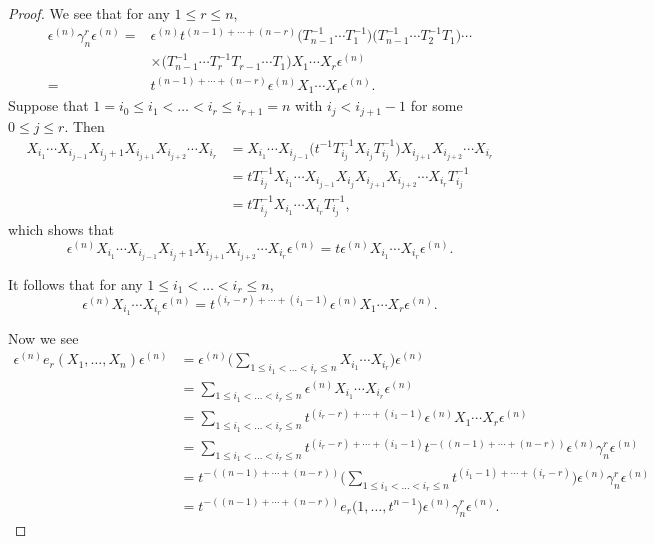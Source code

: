 \documentclass[10pt,a4paper]{amsart}
\numberwithin{equation}{section}
\theoremstyle{definition}
\begin{document}
\begin{proof}
 We see that for any $1\leq r \leq n$,
 \begin{align*}
 \epsilon^{(n)} \gamma_n^{r} \epsilon^{(n)}
 ={}& \epsilon^{(n)}t^{(n-1)+\cdots + (n-r)} \bigl(T_{n-1}^{-1}\cdots T_1^{-1}\bigr)\bigl(T_{n-1}^{-1}\cdots T_2^{-1}T_1\bigr)\cdots\\
 & \times \bigl(T_{n-1}^{-1}\cdots T_r^{-1}T_{r-1}\cdots T_1\bigr) X_1\cdots X_r \epsilon^{(n)} \\
 ={}& t^{(n-1)+\cdots + (n-r)} \epsilon^{(n)} X_1\cdots X_r \epsilon^{(n)}.
 \end{align*}
Suppose that $1 = i_0 \leq i_1 < \dots < i_r \leq i_{r+1} = n $ with $i_j < i_{j+1}-1$ for some $0 \leq j \leq r$. Then
\begin{align*}
 X_{i_1}\cdots X_{i_{j-1}}X_{i_j +1}X_{i_{j+1}}X_{i_{j+2}}\cdots X_{i_r}
 &= X_{i_1}\cdots X_{i_{j-1}} \bigl(t^{-1}T_{i_j}^{-1}X_{i_j}T_{i_j}^{-1}\bigr)X_{i_{j+1}}X_{i_{j+2}}\cdots X_{i_r} \\
 &= tT_{i_j}^{-1} X_{i_1}\cdots X_{i_{j-1}} X_{i_j} X_{i_{j+1}}X_{i_{j+2}}\cdots X_{i_r}T_{i_j}^{-1} \\
 &= tT_{i_j}^{-1}X_{i_1}\cdots X_{i_r} T_{i_j}^{-1} ,
\end{align*}
which shows that
\[
\epsilon^{(n)}X_{i_1}\cdots X_{i_{j-1}}X_{i_j +1}X_{i_{j+1}}X_{i_{j+2}}\cdots X_{i_r} \epsilon^{(n)} = t\epsilon^{(n)}X_{i_1}\cdots X_{i_r}\epsilon^{(n)}.
\]


It follows that for any $1\leq i_1 < \dots < i_r \leq n$,
\[
\epsilon^{(n)}X_{i_1}\cdots X_{i_r}\epsilon^{(n)} = t^{ (i_r -r)+\cdots + (i_1 -1)}\epsilon^{(n)} X_1\cdots X_r\epsilon^{(n)}.
\]


Now we see
\begin{align*}
 \epsilon^{(n)} e_r(X_1,\dots, X_n) \epsilon^{(n)}
 &= \epsilon^{(n)} \biggl(\sum_{1\leq i_1< \dots < i_r \leq n} X_{i_1}\cdots X_{i_r} \biggr) \epsilon^{(n)} \\
 & = \sum_{1\leq i_1< \dots < i_r \leq n} \epsilon^{(n)} X_{i_1}\cdots X_{i_r} \epsilon^{(n)} \\
 & = \sum_{1\leq i_1< \dots < i_r \leq n} t^{ (i_r -r)+\cdots + (i_1 -1)}\epsilon^{(n)} X_1\cdots X_r\epsilon^{(n)} \\
 &= \sum_{1\leq i_1< \dots < i_r \leq n} t^{ (i_r -r)+\cdots + (i_1 -1)} t^{-( (n-1)+\cdots + (n-r))}\epsilon^{(n)} \gamma_n^{r} \epsilon^{(n)} \\
 &= t^{-( (n-1)+\cdots + (n-r))}\biggl(\sum_{1\leq i_1< \dots < i_r \leq n} t^{ (i_1 -1)+\cdots + (i_r -r)}\biggr) \epsilon^{(n)} \gamma_n^{r} \epsilon^{(n)} \\
 & = t^{-( (n-1)+\cdots + (n-r))} e_r\bigl(1,\dots, t^{n-1}\bigr) \epsilon^{(n)} \gamma_n^{r} \epsilon^{(n)}. \tag*{\qed}
\end{align*} \renewcommand{\qed}{}
\end{proof}
\end{document}
